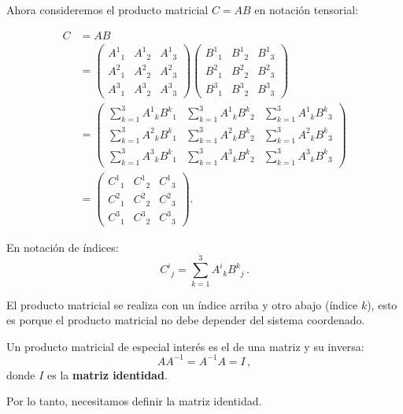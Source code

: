 \documentclass[../apunte_mecanica_clasica.tex]{subfiles}%
\begin{document}
Ahora consideremos el producto matricial $C = AB$ en notación tensorial:

\begin{align*}
C &= AB \\[4pt] 
&=
\begin{pmatrix}
    A^1{}_1 & A^1{}_2 & A^1{}_3 \\
    A^2{}_1 & A^2{}_2 & A^2{}_3 \\
    A^3{}_1 & A^3{}_2 & A^3{}_3
\end{pmatrix}
\begin{pmatrix}
    B^1{}_1 & B^1{}_2 & B^1{}_3 \\
    B^2{}_1 & B^2{}_2 & B^2{}_3 \\
    B^3{}_1 & B^3{}_2 & B^3{}_3
\end{pmatrix} \\[4pt]
&=
\begin{pmatrix}
    \sum_{k=1}^3 A^1{}_k B^k{}_1 & \sum_{k=1}^3 A^1{}_k B^k{}_2 & \sum_{k=1}^3 A^1{}_k B^k{}_3 \\
    \sum_{k=1}^3 A^2{}_k B^k{}_1 & \sum_{k=1}^3 A^2{}_k B^k{}_2 & \sum_{k=1}^3 A^2{}_k B^k{}_3 \\
    \sum_{k=1}^3 A^3{}_k B^k{}_1 & \sum_{k=1}^3 A^3{}_k B^k{}_2 & \sum_{k=1}^3 A^3{}_k B^k{}_3
\end{pmatrix} \\[4pt]
&=
\begin{pmatrix}
    C^1{}_1 & C^1{}_2 & C^1{}_3 \\
    C^2{}_1 & C^2{}_2 & C^2{}_3 \\
    C^3{}_1 & C^3{}_2 & C^3{}_3
\end{pmatrix}.
\end{align*}

En notación de índices:
\begin{equation*}
    C^i{}_j = \sum_{k=1}^3 A^i{}_k B^k{}_j \,.
\end{equation*}

El producto matricial se realiza con un índice arriba y otro abajo 
(índice $k$), esto es porque el producto matricial no debe depender 
del sistema coordenado.  

Un producto matricial de especial interés es el de una matriz y su 
inversa:
\begin{equation*}
    A A^{-1} = A^{-1} A = I \,,
\end{equation*}
donde $I$ es la \textbf{matriz identidad}.  

Por lo tanto, necesitamos definir la matriz identidad.
\end{document}
